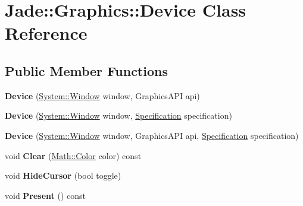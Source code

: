 \hypertarget{class_jade_1_1_graphics_1_1_device}{}\section{Jade\+:\+:Graphics\+:\+:Device Class Reference}
\label{class_jade_1_1_graphics_1_1_device}
\subsection*{Public Member Functions}
\begin{DoxyCompactItemize}
\item 
\hypertarget{class_jade_1_1_graphics_1_1_device_ae91156efbb4d6d2ecb4e802fb86c811c}{}{\bfseries Device} (\hyperlink{class_jade_1_1_system_1_1_window}{System\+::\+Window} window, Graphics\+A\+P\+I api)\label{class_jade_1_1_graphics_1_1_device_ae91156efbb4d6d2ecb4e802fb86c811c}

\item 
\hypertarget{class_jade_1_1_graphics_1_1_device_ace77919e2d017a9ab38b6b2fb6c29dba}{}{\bfseries Device} (\hyperlink{class_jade_1_1_system_1_1_window}{System\+::\+Window} window, \hyperlink{struct_jade_1_1_graphics_1_1_specification}{Specification} specification)\label{class_jade_1_1_graphics_1_1_device_ace77919e2d017a9ab38b6b2fb6c29dba}

\item 
\hypertarget{class_jade_1_1_graphics_1_1_device_a5d71a3def2b23e9a99c62e0092378887}{}{\bfseries Device} (\hyperlink{class_jade_1_1_system_1_1_window}{System\+::\+Window} window, Graphics\+A\+P\+I api, \hyperlink{struct_jade_1_1_graphics_1_1_specification}{Specification} specification)\label{class_jade_1_1_graphics_1_1_device_a5d71a3def2b23e9a99c62e0092378887}

\item 
\hypertarget{class_jade_1_1_graphics_1_1_device_acf66d5f61f5489f8081fea84b3752ac3}{}void {\bfseries Clear} (\hyperlink{struct_jade_1_1_math_1_1_color}{Math\+::\+Color} color) const \label{class_jade_1_1_graphics_1_1_device_acf66d5f61f5489f8081fea84b3752ac3}

\item 
\hypertarget{class_jade_1_1_graphics_1_1_device_a0808ac953233cdf240789f7e0dd678ce}{}void {\bfseries Hide\+Cursor} (bool toggle)\label{class_jade_1_1_graphics_1_1_device_a0808ac953233cdf240789f7e0dd678ce}

\item 
\hypertarget{class_jade_1_1_graphics_1_1_device_a037cd57e0e544caf0aaa793162cd23b3}{}void {\bfseries Present} () const \label{class_jade_1_1_graphics_1_1_device_a037cd57e0e544caf0aaa793162cd23b3}


\end{DoxyCompactItemize}
